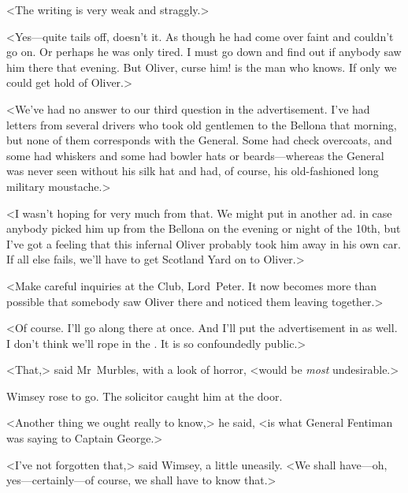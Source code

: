 <The writing is very weak and straggly.>

<Yes—quite tails off, doesn't it. As though he had come over faint and couldn't go on. Or perhaps he was only tired. I must go down and find out if anybody saw him there that evening. But Oliver, curse him! is the man who knows. If only we could get hold of Oliver.>

<We've had no answer to our third question in the advertisement. I've had letters from several drivers who took old gentlemen to the Bellona that morning, but none of them corresponds with the General. Some had check overcoats, and some had whiskers and some had bowler hats or beards—whereas the General was never seen without his silk hat and had, of course, his old-fashioned long military moustache.>

<I wasn't hoping for very much from that. We might put in another ad. in case anybody picked him up from the Bellona on the evening or night of the 10th, but I've got a feeling that this infernal Oliver probably took him away in his own car. If all else fails, we'll have to get Scotland Yard on to Oliver.>

<Make careful inquiries at the Club, Lord~Peter. It now becomes more than possible that somebody saw Oliver there and noticed them leaving together.>

<Of course. I'll go along there at once. And I'll put the advertisement in as well. I don't think we'll rope in the . It is so confoundedly public.>

<That,> said Mr~Murbles, with a look of horror, <would be \emph{most} undesirable.>

Wimsey rose to go. The solicitor caught him at the door.

<Another thing we ought really to know,> he said, <is what General Fentiman was saying to Captain George.>

<I've not forgotten that,> said Wimsey, a little uneasily. <We shall have—oh, yes—certainly—of course, we shall have to know that.>